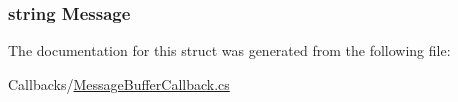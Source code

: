 \subsubsection[{Message}]{\setlength{\rightskip}{0pt plus 5cm}string Message}\label{structOTA_1_1Callbacks_1_1PlayerCommandReceived_a40e8debace0cc6f4f7baa0fdd309c103}


The documentation for this struct was generated from the following file\+:\begin{DoxyCompactItemize}
\item 
Callbacks/\hyperlink{MessageBufferCallback_8cs}{Message\+Buffer\+Callback.\+cs}\end{DoxyCompactItemize}
